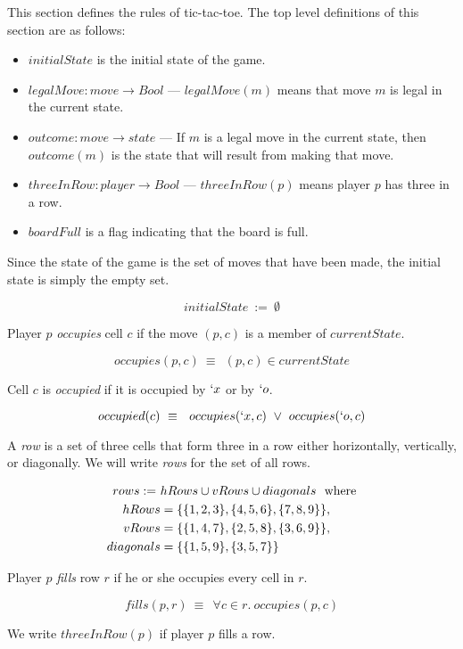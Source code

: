 \documentclass[a4paper]{article}
\newcommand{\defun}[2] {$$ #1\ :=\ #2$$}
\newcommand{\defpred}[2]{ $$ #1\ \equiv\ #2$$}
\begin{document}
This section defines the rules of tic-tac-toe. The top level definitions of this section are as follows:
\begin{itemize}
\item $initialState$ is the initial state of the game.
\item $legalMove: move\rightarrow Bool$ --- $legalMove(m)$ means that move $m$ is legal in the current state.
\item $outcome:move \rightarrow state$ --- If  $m$ is a legal move in the current state, then $outcome(m)$ is the state that will result from making that move.
\item $threeInRow:player \rightarrow Bool$ --- $threeInRow(p)$ means player $p$ has three in a row. 
\item $boardFull$ is a flag indicating that the board is full.
\end{itemize}

\bigskip\noindent
Since the state of the game is the set of moves that have been made, the initial state is simply the empty set.

\defun{initialState} {\emptyset}

\bigskip\noindent
Player $p$ {\it occupies} cell $c$ if the move $(p,c)$ is a member of $currentState$.

\defpred{occupies(p,c)}{\ (p,c) \in currentState}

\bigskip\noindent
Cell $c$ is {\it occupied} if it is occupied by $`x$ or by $`o$.

\defpred {occupied(c)} {\ occupies(`x,c)\ \vee\ occupies(`o,c)}


\bigskip\noindent
A {\it row} is a set of three cells that form three in a row either horizontally, vertically, or diagonally. We will write {\it rows} for the set of all rows.

\begin{align*}
rows  := \ & hRows \cup vRows \cup diagonals \ \ \text{where} \\  
    \smallskip
    hRows &= \{\{1,2,3\},\{4,5,6\},\{7,8,9\}\}, \\
    vRows &= \{\{1,4,7\},\{2,5,8\},\{3,6,9\}\}, \\
    diagonals&= \{\{1,5,9\},\{3,5,7\}\}
\end{align*}

\bigskip\noindent
Player $p$ {\it fills} row $r$ if he or she occupies every cell in $r$.

\defpred{fills(p,r)}{\ \forall c\in r.\ occupies(p,c)}

\bigskip\noindent
We write $threeInRow(p)$ if player $p$ fills a row.
\end{document}
